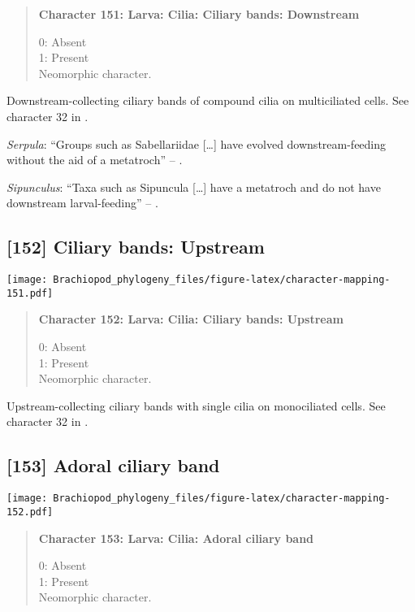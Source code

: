 \documentclass[openany]{book}
\theoremstyle{definition}
\theoremstyle{definition}
\theoremstyle{definition}
\theoremstyle{remark}
\begin{document}
\begin{quote}
\textbf{Character 151: Larva: Cilia: Ciliary bands: Downstream}

0: Absent\\
1: Present\\
Neomorphic character.
\end{quote}

Downstream-collecting ciliary bands of compound cilia on multiciliated
cells. See character 32 in \citet{Glenner2004}.

\hypertarget{Serpula-coding-151}{}
\emph{Serpula}: ``Groups such as Sabellariidae {[}\ldots{}{]} have
evolved downstream-feeding without the aid of a metatroch'' --
\citep{Rouse2000}.

\hypertarget{Sipunculus-coding-151}{}
\emph{Sipunculus}: ``Taxa such as Sipuncula {[}\ldots{}{]} have a
metatroch and do not have downstream larval-feeding'' --
\citet{Rouse2000}.

\subsection*{{[}152{]} Ciliary bands:
Upstream}\label{ciliary-bands-upstream}

\texttt{[image: Brachiopod\_phylogeny\_files/figure-latex/character-mapping-151.pdf]}

\begin{quote}
\textbf{Character 152: Larva: Cilia: Ciliary bands: Upstream}

0: Absent\\
1: Present\\
Neomorphic character.
\end{quote}

Upstream-collecting ciliary bands with single cilia on monociliated
cells. See character 32 in \citet{Glenner2004}.

\subsection*{{[}153{]} Adoral ciliary band}\label{adoral-ciliary-band}

\texttt{[image: Brachiopod\_phylogeny\_files/figure-latex/character-mapping-152.pdf]}

\begin{quote}
\textbf{Character 153: Larva: Cilia: Adoral ciliary band}

0: Absent\\
1: Present\\
Neomorphic character.
\end{quote}
\end{document}
